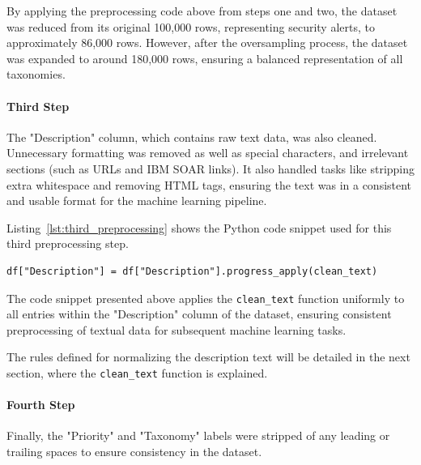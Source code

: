 By applying the preprocessing code above from steps one and two, the dataset was reduced from its original 100,000 rows, representing security alerts, to approximately 86,000 rows.
However, after the oversampling process, the dataset was expanded to around 180,000 rows, ensuring a balanced representation of all taxonomies.

\paragraph{Third Step}

The "Description" column, which contains raw text data, was also cleaned. 
Unnecessary formatting was removed as well as special characters, and irrelevant sections (such as URLs and IBM SOAR links). 
It also handled tasks like stripping extra whitespace and removing HTML tags, ensuring the text was in a consistent and usable format for the machine learning pipeline.

Listing~\ref{lst:third_preprocessing} shows the Python code snippet used for this third preprocessing step.

\vspace{0.2cm}
\noindent
\begin{minipage}{\linewidth}
\begin{verbatim}
df["Description"] = df["Description"].progress_apply(clean_text)
\end{verbatim}
\label{lst:third_preprocessing}
\end{minipage}
\vspace{0.1cm}

The code snippet presented above applies the \texttt{clean\_text} function uniformly to all entries within the "Description" column of the dataset, ensuring consistent preprocessing of textual data for subsequent machine learning tasks.

The rules defined for normalizing the description text will be detailed in the next section, where the \texttt{clean\_text} function is explained.

\paragraph{Fourth Step}

Finally, the "Priority" and "Taxonomy" labels were stripped of any leading or trailing spaces to ensure consistency in the dataset. 

